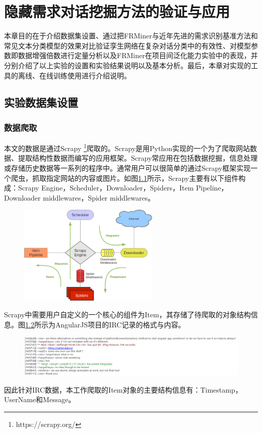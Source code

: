 \chapter{隐藏需求对话挖掘方法的验证与应用}
本章目的在于介绍数据集设置、通过把FRMiner与近年先进的需求识别基准方法和常见文本分类模型的效果对比验证孪生网络在复杂对话分类中的有效性、对模型参数即数据增强倍数进行定量分析以及FRMiner在项目间泛化能力实验中的表现，并分别介绍了以上实验的设置和实验结果说明以及基本分析。最后，本章对实现的{\tool}工具的离线、在线训练使用进行介绍说明。

\section{实验数据集设置}
\subsection{数据爬取}
本文的数据是通过Scrapy \footnote{https://scrapy.org/}爬取的。Scrapy是用Python实现的一个为了爬取网站数据、提取结构性数据而编写的应用框架。Scrapy常应用在包括数据挖掘，信息处理或存储历史数据等一系列的程序中。通常用户可以很简单的通过Scrapy框架实现一个爬虫，抓取指定网站的内容或图片。如图\ref{fig:scrapy}所示，Scrapy主要有以下组件构成：Scrapy Engine，Scheduler，Downloader，Spiders，Item Pipeline，Downloader middlewares，Spider middlewares。
\begin{figure}[htbp]
    \centering
    \includegraphics[width=0.6\textwidth]{Img/scrapy.png}
    \label{fig:scrapy}
\end{figure}
Scrapy中需要用户自定义的一个核心的组件为Item，其存储了待爬取的对象结构信息。图\ref{fig:echelog}所示为AngularJS项目的IRC记录的格式与内容。
\begin{figure}[htbp]
    \centering
    \includegraphics[width=\textwidth]{Img/echelog.png}
    \label{fig:echelog}
\end{figure}
因此针对IRC数据，本工作爬取的Item对象的主要结构信息有：Timestamp，UserName和Message。

